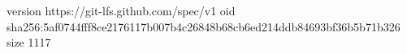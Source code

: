 version https://git-lfs.github.com/spec/v1
oid sha256:5af0744fff8ce2176117b007b4c26848b68cb6ed214ddb84693bf36b5b71b326
size 1117
